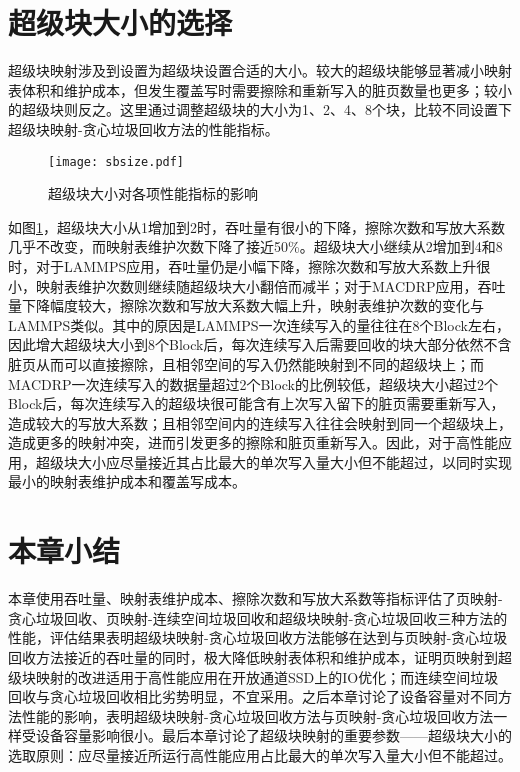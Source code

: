 \section{超级块大小的选择}

超级块映射涉及到设置为超级块设置合适的大小。较大的超级块能够显著减小映射表体积和维护成本，但发生覆盖写时需要擦除和重新写入的脏页数量也更多；较小的超级块则反之。这里通过调整超级块的大小为1、2、4、8个块，比较不同设置下超级块映射-贪心垃圾回收方法的性能指标。

\begin{figure}[H]
    \centering
    \texttt{[image: sbsize.pdf]}
    \caption{超级块大小对各项性能指标的影响}
    \label{fig:res_sbsize}
\end{figure}

如图\ref{fig:res_sbsize}，超级块大小从1增加到2时，吞吐量有很小的下降，擦除次数和写放大系数几乎不改变，而映射表维护次数下降了接近50\%。超级块大小继续从2增加到4和8时，对于LAMMPS应用，吞吐量仍是小幅下降，擦除次数和写放大系数上升很小，映射表维护次数则继续随超级块大小翻倍而减半；对于MACDRP应用，吞吐量下降幅度较大，擦除次数和写放大系数大幅上升，映射表维护次数的变化与LAMMPS类似。其中的原因是LAMMPS一次连续写入的量往往在8个Block左右，因此增大超级块大小到8个Block后，每次连续写入后需要回收的块大部分依然不含脏页从而可以直接擦除，且相邻空间的写入仍然能映射到不同的超级块上；而MACDRP一次连续写入的数据量超过2个Block的比例较低，超级块大小超过2个Block后，每次连续写入的超级块很可能含有上次写入留下的脏页需要重新写入，造成较大的写放大系数；且相邻空间内的连续写入往往会映射到同一个超级块上，造成更多的映射冲突，进而引发更多的擦除和脏页重新写入。因此，对于高性能应用，超级块大小应尽量接近其占比最大的单次写入量大小但不能超过，以同时实现最小的映射表维护成本和覆盖写成本。

\section{本章小结}

本章使用吞吐量、映射表维护成本、擦除次数和写放大系数等指标评估了页映射-贪心垃圾回收、页映射-连续空间垃圾回收和超级块映射-贪心垃圾回收三种方法的性能，评估结果表明超级块映射-贪心垃圾回收方法能够在达到与页映射-贪心垃圾回收方法接近的吞吐量的同时，极大降低映射表体积和维护成本，证明页映射到超级块映射的改进适用于高性能应用在开放通道SSD上的IO优化；而连续空间垃圾回收与贪心垃圾回收相比劣势明显，不宜采用。之后本章讨论了设备容量对不同方法性能的影响，表明超级块映射-贪心垃圾回收方法与页映射-贪心垃圾回收方法一样受设备容量影响很小。最后本章讨论了超级块映射的重要参数——超级块大小的选取原则：应尽量接近所运行高性能应用占比最大的单次写入量大小但不能超过。